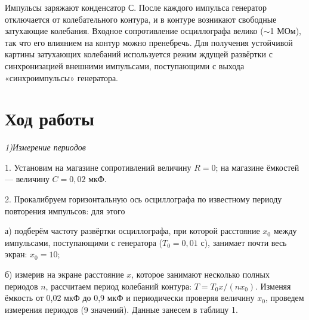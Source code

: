 \documentclass[a4paper,12pt]{article}
\begin{document}
\par Импульсы заряжают конденсатор $С$. После каждого импульса генератор отключается от колебательного контура, и в контуре возникают свободные затухающие колебания. Входное сопротивление осциллографа велико ($\sim$1 МОм), так что его влиянием на контур можно пренебречь. Для получения устойчивой картины затухающих колебаний используется режим ждущей развёртки с синхронизацией внешними импульсами, поступающими с выхода «синхроимпульсы» генератора.

\section{Ход работы}

\par \textit{1)Измерение периодов}
\par 1. Установим на магазине сопротивлений величину $R = 0$; на магазине ёмкостей — величину $C = 0,02$ мкФ.
\par 2. Прокалибруем горизонтальную ось осциллографа по известному периоду повторения импульсов: для этого
\par а) подберём частоту развёртки осциллографа, при которой расстояние $x_0$ между импульсами, поступающими с генератора ($T_0 = 0,01$ с), занимает почти весь экран: $x_0 = 10$;
\par б) измерив на экране расстояние $x$, которое занимают несколько полных периодов $n$, рассчитаем период колебаний контура: $T = T_0 x/(n x_0)$. 
Изменяя ёмкость от 0,02 мкФ до 0,9 мкФ и периодически проверяя величину $x_0$, проведем измерения периодов (9 значений). Данные занесем в таблицу 1.
\end{document}

